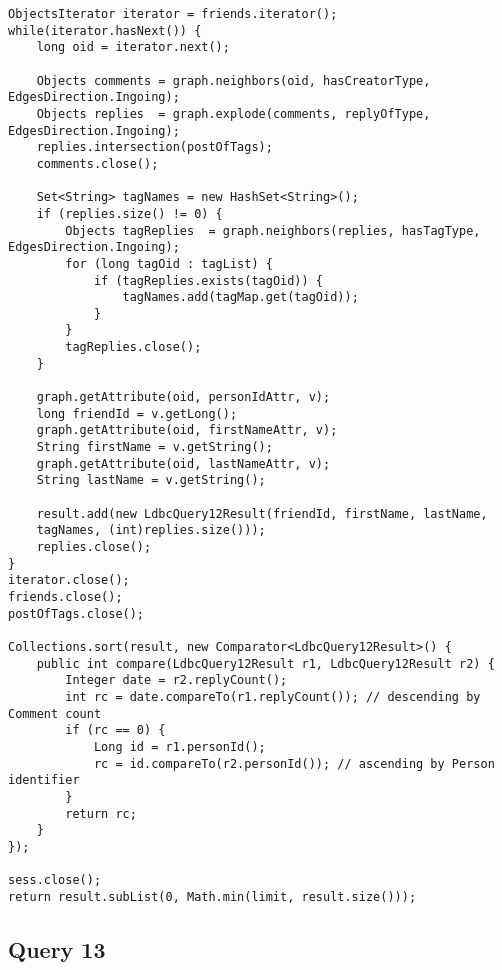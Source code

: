 {\begin{verbatim}
ObjectsIterator iterator = friends.iterator();
while(iterator.hasNext()) {
    long oid = iterator.next();

    Objects comments = graph.neighbors(oid, hasCreatorType, EdgesDirection.Ingoing);
    Objects replies  = graph.explode(comments, replyOfType, EdgesDirection.Ingoing);
    replies.intersection(postOfTags);
    comments.close();

    Set<String> tagNames = new HashSet<String>();
    if (replies.size() != 0) {
        Objects tagReplies  = graph.neighbors(replies, hasTagType, EdgesDirection.Ingoing);
        for (long tagOid : tagList) {
            if (tagReplies.exists(tagOid)) {
                tagNames.add(tagMap.get(tagOid));
            }
        }
        tagReplies.close();
    }

    graph.getAttribute(oid, personIdAttr, v);
    long friendId = v.getLong();
    graph.getAttribute(oid, firstNameAttr, v);
    String firstName = v.getString();
    graph.getAttribute(oid, lastNameAttr, v);
    String lastName = v.getString();

    result.add(new LdbcQuery12Result(friendId, firstName, lastName,
    tagNames, (int)replies.size()));
    replies.close();
}
iterator.close();
friends.close();
postOfTags.close();

Collections.sort(result, new Comparator<LdbcQuery12Result>() {
    public int compare(LdbcQuery12Result r1, LdbcQuery12Result r2) {
        Integer date = r2.replyCount();
        int rc = date.compareTo(r1.replyCount()); // descending by Comment count
        if (rc == 0) {
            Long id = r1.personId();
            rc = id.compareTo(r2.personId()); // ascending by Person identifier
        }
        return rc;
    }
});

sess.close();
return result.subList(0, Math.min(limit, result.size()));
\end{verbatim}
}

\subsection{Query 13}


